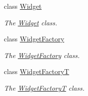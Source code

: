\begin{DoxyCompactItemize}
class \hyperlink{classcanvascv_1_1Widget}{Widget}
\begin{DoxyCompactList}\small\item\em The \hyperlink{classcanvascv_1_1Widget}{Widget} class. \end{DoxyCompactList}\item 
class \hyperlink{classcanvascv_1_1WidgetFactory}{Widget\+Factory}
\begin{DoxyCompactList}\small\item\em The \hyperlink{classcanvascv_1_1WidgetFactory}{Widget\+Factory} class. \end{DoxyCompactList}\item 
class \hyperlink{classcanvascv_1_1WidgetFactoryT}{Widget\+FactoryT}
\begin{DoxyCompactList}\small\item\em The \hyperlink{classcanvascv_1_1WidgetFactoryT}{Widget\+FactoryT} class. \end{DoxyCompactList}\end{DoxyCompactItemize}
